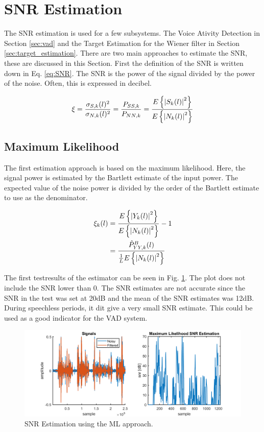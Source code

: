 \section{SNR Estimation} \label{sec:snr_estimation}
The SNR estimation is used for a few subsystems. The Voice Ativity Detection in Section \ref{sec:vad} and the Target Estimation for the Wiener filter in Section \ref{sec:target_estimation}. There are two main approaches to estimate the SNR, these are discussed in this Section.
First the definition of the SNR is written down in Eq. \ref{eq:SNR}. The SNR is the power of the signal divided by the power of the noise. Often, this is expressed in decibel.

\begin{equation}
  \xi = \frac{\sigma_{S,k}(l)^{2}}{\sigma_{N,k}(l)^{2}} =
  \frac{P_{SS,k}}{P_{NN,k}} =
  \frac{E\left\{\abs{S_{k}(l)}^{2}\right\}}{E\left\{\abs{N_{k}(l)}^{2}\right\}}
  \label{eq:SNR}
\end{equation}

\subsection{Maximum Likelihood}
The first estimation approach is based on the maximum likelihood. Here, the signal power is estimated by the Bartlett estimate of the input power. The expected value of the noise power is divided by the order of the Bartlett estimate to use as the denominator.

\begin{align}
  \xi_{k}(l) &= \frac{E\left\{\abs{Y_{k}(l)}^{2}\right\}}{E\left\{\abs{N_{k}(l)}^{2}\right\}} - 1
  \label{eq:ML1}\\
  &= \frac{\hat P_{YY,k}^{B}(l)}{\frac{1}{L}E\left\{\abs{N_{k}(l)}^{2}\right\}}
  \label{eq:M2}
\end{align}

The first testresults of the estimator can be seen in Fig. \ref{fig:mlsnr}. The plot does not include the SNR lower than 0. The SNR estimates are not accurate since the SNR in the test was set at 20dB and the mean of the SNR estimates was 12dB. During speechless periods, it dit give a very small SNR estimate. This could be used as a good indicator for the VAD system.

\begin{figure}[h]
  \centering
  \includegraphics[width=\textwidth]{images/mlsnr.png}
  \caption{SNR Estimation using the ML approach.}
  \label{fig:mlsnr}
\end{figure}

